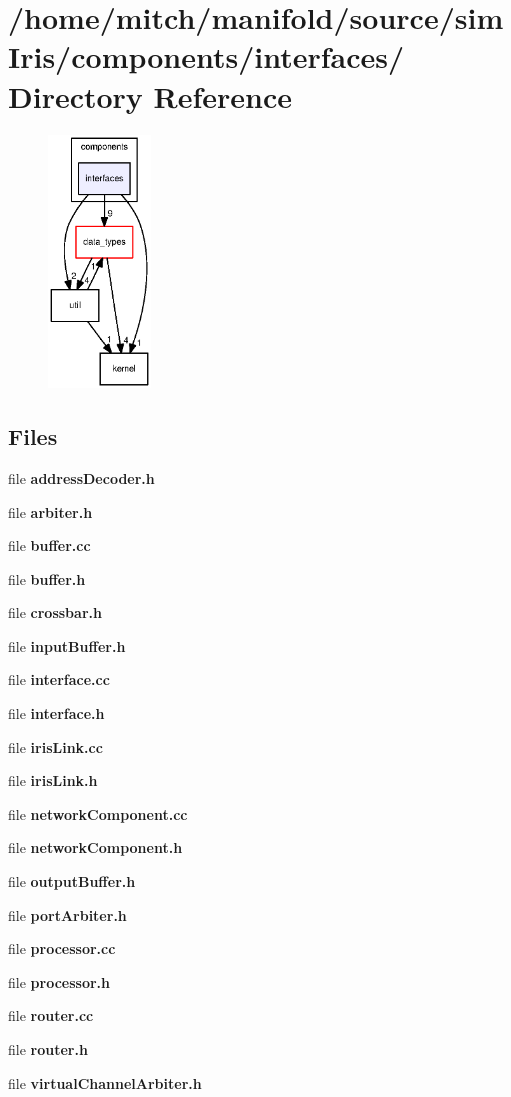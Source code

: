 \section{/home/mitch/manifold/source/simIris/components/interfaces/ Directory Reference}
\label{dir_5752eadbeec8a35d1aa3f18b2c82bb1d}


\nopagebreak
\begin{figure}[H]
\begin{center}
\leavevmode
\includegraphics[width=77pt]{dir_5752eadbeec8a35d1aa3f18b2c82bb1d_dep}
\end{center}
\end{figure}
\subsection*{Files}
\begin{CompactItemize}
\item 
file {\bf addressDecoder.h}
\item 
file {\bf arbiter.h}
\item 
file {\bf buffer.cc}
\item 
file {\bf buffer.h}
\item 
file {\bf crossbar.h}
\item 
file {\bf inputBuffer.h}
\item 
file {\bf interface.cc}
\item 
file {\bf interface.h}
\item 
file {\bf irisLink.cc}
\item 
file {\bf irisLink.h}
\item 
file {\bf networkComponent.cc}
\item 
file {\bf networkComponent.h}
\item 
file {\bf outputBuffer.h}
\item 
file {\bf portArbiter.h}
\item 
file {\bf processor.cc}
\item 
file {\bf processor.h}
\item 
file {\bf router.cc}
\item 
file {\bf router.h}
\item 
file {\bf virtualChannelArbiter.h}
\end{CompactItemize}
